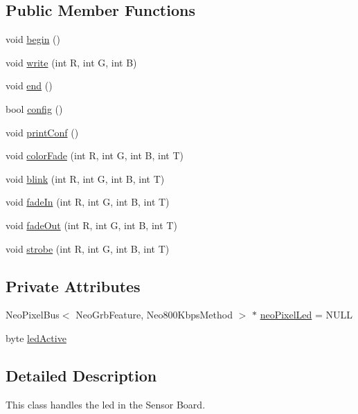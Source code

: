 \subsection*{Public Member Functions}
\begin{DoxyCompactItemize}
\item 
void \hyperlink{classCoolBoardLed_ae3cbde8affcc6f011cbd698c8ef911f6}{begin} ()
\item 
void \hyperlink{classCoolBoardLed_a30fadd4cbec17ceea428bf7a32207e87}{write} (int R, int G, int B)
\item 
void \hyperlink{classCoolBoardLed_a69f323359e0c9f797422f2152b5d41ef}{end} ()
\item 
bool \hyperlink{classCoolBoardLed_a1b60e5e30bea96c49ed62ed1bf1ffc8b}{config} ()
\item 
void \hyperlink{classCoolBoardLed_a8ed3053a36f0ed4a131f43b5b17efb61}{print\+Conf} ()
\item 
void \hyperlink{classCoolBoardLed_a6dbfe23988f43e1242cd05e69b13ff30}{color\+Fade} (int R, int G, int B, int T)
\item 
void \hyperlink{classCoolBoardLed_a27706bc029f6a126c55d0b91624ad7fa}{blink} (int R, int G, int B, int T)
\item 
void \hyperlink{classCoolBoardLed_aec915442a8441c7cd45c3279d3ff8821}{fade\+In} (int R, int G, int B, int T)
\item 
void \hyperlink{classCoolBoardLed_a27c4e14fa2cd3639c0844152cea98887}{fade\+Out} (int R, int G, int B, int T)
\item 
void \hyperlink{classCoolBoardLed_adc08c0ac07473499971c503d300f0413}{strobe} (int R, int G, int B, int T)
\end{DoxyCompactItemize}
\subsection*{Private Attributes}
\begin{DoxyCompactItemize}
\item 
Neo\+Pixel\+Bus$<$ Neo\+Grb\+Feature, Neo800\+Kbps\+Method $>$ $\ast$ \hyperlink{classCoolBoardLed_ac2c13fa462a010cd9242bf297c013923}{neo\+Pixel\+Led} = N\+U\+LL
\item 
byte \hyperlink{classCoolBoardLed_a5f17c135516fcf4b44ea8a096ba0177a}{led\+Active}
\end{DoxyCompactItemize}


\subsection{Detailed Description}
This class handles the led in the Sensor Board. 

